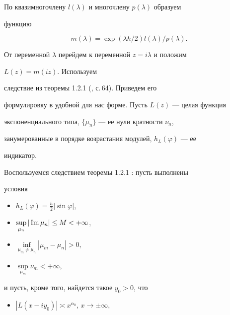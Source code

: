 \begin{pf} 


По квазимногочлену $l(\lambda)$ и многочлену $p(\lambda)$ образуем 


функцию 


\begin{equation} 


\label{13} 


m(\lambda)=\exp(\lambda h/2)l(\lambda)/p(\lambda). 


\end{equation} 


От переменной $\lambda$ перейдем к переменной $z=i\lambda$ и положим 


$L(z)=m(iz)$. Используем 


следствие из теоремы 1.2.1 (\cite{7}, с.\,64). Приведем его 


формулировку в удобной для нас форме. Пусть $L(z)$ --- целая функция 


экспоненциального типа, $\{\mu_n\}$ --- ее нули кратности $\nu_n$, 


занумерованные в порядке возрастания модулей, $h_L(\varphi)$ --- ее 


индикатор. 


 


Воспользуемся следствием теоремы 1.2.1 \cite{7}: пусть выполнены 


условия 


\begin{itemize} 


\item[(A1)] $h_L(\varphi)=\frac{h}{2}|\sin\varphi|$, 


\item[(A2)] $\sup\limits_{\mu_n}|\operatorname{Im}\mu_n|\le M<+\infty$, 


\item[(A3)] $\inf\limits_{\mu_m\ne\mu_n}|\mu_m-\mu_n|>0$, 


\item[(A4)] $\sup\limits_{\mu_m}\nu_m<+\infty$,


\end{itemize} 


и пусть, кроме того, найдется такое $y_0>0$, что 


\begin{itemize} 


\item[(A5)] $|L(x-i y_0)|\asymp x^{\alpha_0}$, $x\to\pm\infty$, 


\end{itemize} 



\end{pf}
